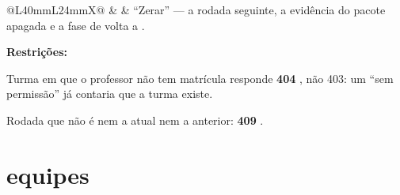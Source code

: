 \begin{tabularx}{\linewidth}{@{}L{40mm}L{24mm}X@{}}
 &  & \enquote{Zerar} --- a rodada seguinte, a evidência do pacote apagada  e a fase de volta a .\par \textbf{Restrições:}\par \hspace*{1em}\textbullet{} Turma em que o professor não tem matrícula responde \textbf{404} , não 403: um \enquote{sem permissão} já contaria que a turma existe.\par \hspace*{1em}\textbullet{} Rodada que não é nem a atual nem a anterior: \textbf{409} .\\
\bottomrule
\end{tabularx}

\section{equipes}

